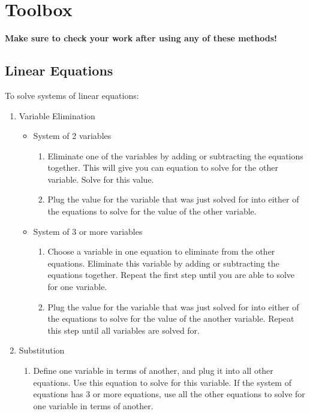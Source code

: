 \documentclass[a4paper,12pt]{article}
\theoremstyle{definition}
\theoremstyle{definition}
\begin{document}
	\section{Toolbox}
	\textbf{Make sure to check your work after using any of these methods!}
	
	\subsection{Linear Equations}
	To solve systems of linear equations:
	\begin{enumerate}
		\item Variable Elimination
		\begin{itemize}
			\item System of 2 variables
			\begin{enumerate}
				\item Eliminate one of the variables by adding or subtracting the equations together. This will give you can equation to solve for the other variable. Solve for this value.
				\item Plug the value for the variable that was just solved for into either of the equations to solve for the value of the other variable.
			\end{enumerate}
			\item System of 3 or more variables
			\begin{enumerate}
				\item Choose a variable in one equation to eliminate from the other equations. Eliminate this variable by adding or subtracting the equations together. Repeat the first step until you are able to solve for one variable.
				\item Plug the value for the variable that was just solved for into either of the equations to solve for the value of the another variable. Repeat this step until all variables are solved for.
			\end{enumerate}
		\end{itemize}
		\item Substitution
		\begin{enumerate}
			\item Define one variable in terms of another, and plug it into all other equations. Use this equation to solve for this variable. If the system of equations has 3 or more equations, use all the other equations to solve for one variable in terms of another.
		\end{enumerate}
	\end{enumerate}
\end{document}
